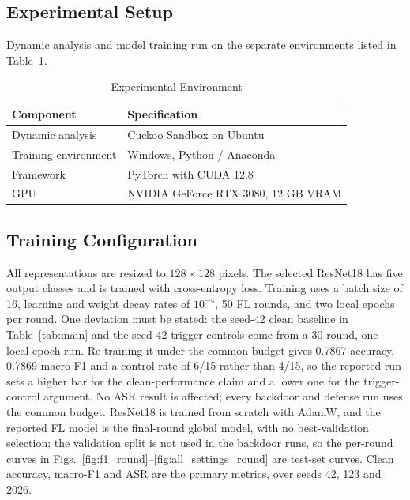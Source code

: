 \documentclass[conference]{IEEEtran}
\begin{document}
\subsection{Experimental Setup}

Dynamic analysis and model training run on the separate environments listed in Table~\ref{tab:environment}.

\begin{table}[h]
	\caption{Experimental Environment}
	\label{tab:environment}
	\footnotesize
	\centering
	\setlength{\tabcolsep}{4pt}
	\begin{tabular}{ll}
		\toprule
		\textbf{Component} & \textbf{Specification} \\
		\midrule
		Dynamic analysis & Cuckoo Sandbox on Ubuntu \\
		Training environment & Windows, Python / Anaconda \\
		Framework & PyTorch with CUDA 12.8 \\
		GPU & NVIDIA GeForce RTX 3080, 12 GB VRAM \\
		\bottomrule
	\end{tabular}
\end{table}

\subsection{Training Configuration}

All representations are resized to $128 \times 128$ pixels. The selected ResNet18 has five output classes and is trained with cross-entropy loss. 
Training uses a batch size of 16, learning and weight decay rates of $10^{-4}$, 50 FL rounds, and two local epochs per round. One deviation must be stated: the seed-42 clean baseline in Table~\ref{tab:main} and the seed-42 trigger controls come from a 30-round, one-local-epoch run. Re-training it under the common budget gives 0.7867 accuracy, 0.7869 macro-F1 and a control rate of 6/15 rather than 4/15, so the reported run sets a higher bar for the clean-performance claim and a lower one for the trigger-control argument. No ASR result is affected; every backdoor and defense run uses the common budget. ResNet18 is trained from scratch with AdamW, and the reported FL model is the final-round global model, with no best-validation selection; the validation split is not used in the backdoor runs, so the per-round curves in Figs.~\ref{fig:f1_round}--\ref{fig:all_settings_round} are test-set curves. Clean accuracy, macro-F1 and ASR are the primary metrics, over seeds 42, 123 and 2026.
\end{document}
